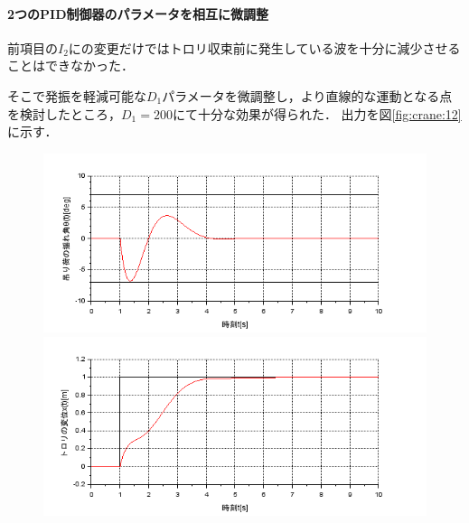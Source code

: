 \documentclass[dvipdfmx,titlepage,a4j]{jsarticle}  %
\begin{document}
\paragraph{2つのPID制御器のパラメータを相互に微調整\\}
前項目の$I_2$にの変更だけではトロリ収束前に発生している波を十分に減少させることはできなかった．

そこで発振を軽減可能な$D_1$パラメータを微調整し，より直線的な運動となる点を検討したところ，$D_1 = 200$にて十分な効果が得られた．
出力を図\ref{fig:crane:12}に示す．

\begin{figure}[H]
  \begin{minipage}{4.5cm}
    \centering
    \includegraphics[keepaspectratio, scale=0.35]{../graph/crane/ang-P1-300-I1-0-D1-200-P2-1000-I2-1500-D2-0.png}
  \end{minipage}
  \hfill
  \begin{minipage}{4.5cm}
    \centering
    \includegraphics[keepaspectratio, scale=0.35]{../graph/crane/po-P1-300-I1-0-D1-200-P2-1000-I2-1500-D2-0.png}
  \end{minipage}
  \hfill
  \begin{minipage}{3cm}
    \begin{center}

\end{center}
\end{minipage}
\end{figure}
\end{document}

